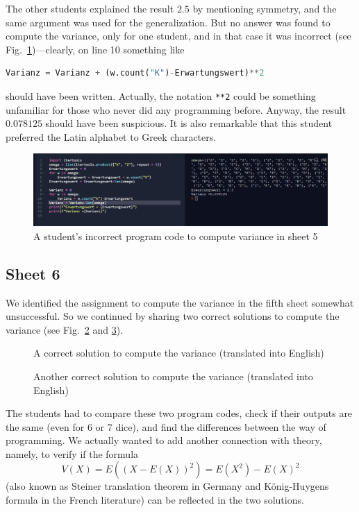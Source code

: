 \documentclass[]{interact}
\theoremstyle{plain}%
\theoremstyle{definition}
\theoremstyle{remark}
\begin{document}
The other students explained the result $2.5$ by mentioning symmetry, and the same argument was
used for the generalization. But no answer was found to compute the variance, only for one student,
and in that case it was incorrect (see Fig.~\ref{52})---clearly, on line 10 something like
\begin{lstlisting}[language=Python,firstnumber=10]
  Varianz = Varianz + (w.count("K")-Erwartungswert)**2
\end{lstlisting}
should have been written. Actually, the notation \texttt{**2} could be something unfamiliar
for those who never did any programming before. Anyway, the result $0.078125$ should have been
suspicious. It is also remarkable that this student preferred the Latin alphabet to Greek characters.
\begin{figure}
\begin{center}\includegraphics[width=1.0\textwidth]{52}
\caption{A student's incorrect program code to compute variance in sheet 5}
\label{52}
\end{center}
\end{figure}

\subsection*{Sheet 6}

We identified the assignment to compute the variance in the fifth sheet somewhat unsuccessful.
So we continued by sharing two correct solutions to compute the variance (see Fig.~\ref{6a.py}
and \ref{6b.py}).

\begin{figure}

\caption{A correct solution to compute the variance (translated into English)}
\label{6a.py}
\end{figure}

\begin{figure}

\caption{Another correct solution to compute the variance (translated into English)}
\label{6b.py}
\end{figure}

The students had to compare these two program codes, check if their outputs are the same
(even for 6 or 7 dice), and find the differences between the way of programming.
We actually wanted to add another connection with theory, namely, to verify if the
formula
\begin{equation}
V(X)=E((X-E(X))^2)=E(X^2)-E(X)^2
\label{variance}
\end{equation}
(also known as Steiner translation theorem in Germany and König-Huygens formula in the French literature)
can be reflected in the two solutions.
\end{document}

